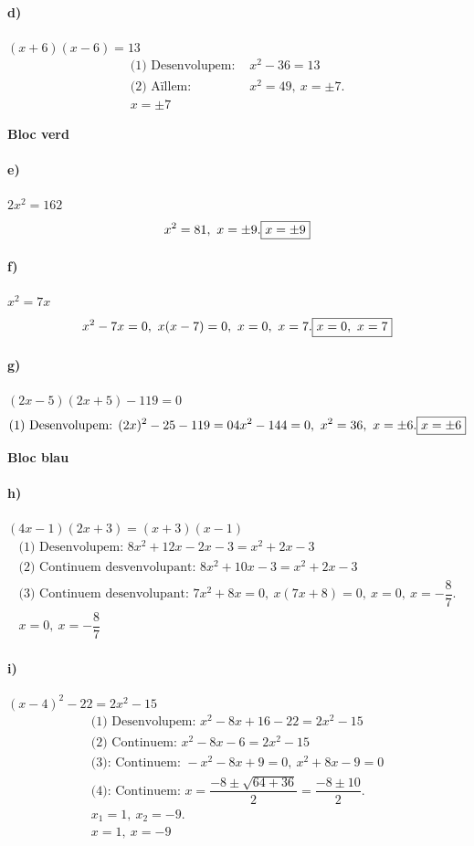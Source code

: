 \documentclass[11pt,a4paper]{article}
\begin{document}
\paragraph{d)} $(x + 6)(x - 6) = 13$
\[
\begin{aligned}
\text{(1) Desenvolupem: } & x^2 - 36 = 13 \\
\text{(2) Aïllem: } & x^2 = 49,\ x=\pm7. \\
\boxed{x=\pm7}
\end{aligned}
\]

\textbf{Bloc verd}

\paragraph{e)} $2x^2 = 162$
\[
x^2=81,\ x=\pm9. \\
\boxed{x=\pm9}
\]

\paragraph{f)} $x^2 = 7x$
\[
x^2 - 7x = 0,\ x(x-7)=0,\ x=0,\ x=7. \\
\boxed{x=0,\ x=7}
\]

\paragraph{g)} $(2x - 5)(2x + 5) - 119 = 0$
\[
\text{(1) Desenvolupem: } (2x)^2 - 25 - 119 = 0 \\
4x^2 - 144 = 0,\ x^2=36,\ x=\pm6. \\
\boxed{x=\pm6}
\]

\textbf{Bloc blau}

\paragraph{h)} $(4x - 1)(2x + 3) = (x + 3)(x - 1)$
\[
\begin{aligned}
\text{(1) Desenvolupem: } 8x^2 + 12x - 2x - 3 = x^2 + 2x - 3 \\
\text{(2) Continuem desvenvolupant: } 8x^2 + 10x - 3 = x^2 + 2x - 3 \\
\text{(3) Continuem desenvolupant: } 7x^2 + 8x = 0,\ x(7x+8)=0,\ x=0,\ x=-\dfrac{8}{7}. \\
\boxed{x=0,\ x=-\dfrac{8}{7}}
\end{aligned}
\]

\paragraph{i)} $(x - 4)^2 - 22 = 2x^2 - 15$
\[
\begin{aligned}
\text{(1) Desenvolupem: } x^2 - 8x + 16 - 22 = 2x^2 - 15 \\
\text{(2) Continuem: }  x^2 - 8x - 6 = 2x^2 - 15 \\
\text{(3): Continuem: } -x^2 - 8x + 9 = 0,\ x^2 + 8x - 9 = 0 \\
\text{(4): Continuem: } x=\dfrac{-8\pm\sqrt{64+36}}{2}=\dfrac{-8\pm10}{2}. \\
x_1=1,\ x_2=-9. \\
\boxed{x=1,\ x=-9}
\end{aligned}
\]
\end{document}
